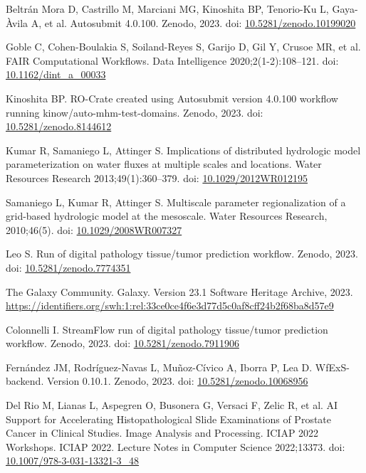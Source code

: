 \documentclass[10pt,letterpaper]{article}
\begin{document}
\begin{thebibliography}{10}
\begin{small}
Beltrán Mora D, Castrillo M, Marciani MG, Kinoshita BP, Tenorio-Ku L, Gaya-Àvila A, et al.
Autosubmit 4.0.100.
Zenodo, 2023.
doi: \href{https://doi.org/10.5281/zenodo.10199020}{10.5281/zenodo.10199020}

Goble C, Cohen-Boulakia S, Soiland-Reyes S, Garijo D, Gil Y, Crusoe MR, et al.
FAIR Computational Workflows.
Data Intelligence 2020;2(1-2):108--121.
doi: \href{https://doi.org/10.1162/dint_a_00033}{10.1162/dint\_a\_00033}

Kinoshita BP.
RO-Crate created using Autosubmit version 4.0.100 workflow running kinow/auto-mhm-test-domains.
Zenodo, 2023.
doi: \href{https://doi.org/10.5281/zenodo.8144612}{10.5281/zenodo.8144612}

Kumar R, Samaniego L, Attinger S.
Implications of distributed hydrologic model parameterization on water fluxes at multiple scales and locations.
Water Resources Research 2013;49(1):360--379.
doi: \href{https://doi.org/10.1029/2012WR012195}{10.1029/2012WR012195}

Samaniego L, Kumar R, Attinger S.
Multiscale parameter regionalization of a grid-based hydrologic model at the mesoscale.
Water Resources Research, 2010;46(5).
doi: \href{https://doi.org/10.1029/2008WR007327}{10.1029/2008WR007327}

Leo S.
Run of digital pathology tissue/tumor prediction workflow.
Zenodo, 2023.
doi: \href{https://doi.org/10.5281/zenodo.7774351}{10.5281/zenodo.7774351}

The Galaxy Community.
Galaxy. Version 23.1
Software Heritage Archive, 2023.
\url{https://identifiers.org/swh:1:rel:33ce0ce4f6e3d77d5c0af8cff24b2f68ba8d57e9}

Colonnelli I.
StreamFlow run of digital pathology tissue/tumor prediction workflow.
Zenodo, 2023.
doi: \href{https://doi.org/10.5281/zenodo.7911906}{10.5281/zenodo.7911906}

Fernández JM, Rodríguez-Navas L, Muñoz-Cívico A, Iborra P, Lea D.
WfExS-backend. Version 0.10.1.
Zenodo, 2023.
doi: \href{https://doi.org/10.5281/zenodo.10068956}{10.5281/zenodo.10068956}

Del Rio M, Lianas L, Aspegren O, Busonera G, Versaci F, Zelic R, et al.
AI Support for Accelerating Histopathological Slide Examinations of Prostate Cancer in Clinical Studies.
Image Analysis and Processing. ICIAP 2022 Workshops. ICIAP 2022. Lecture Notes in Computer Science 2022;13373.
doi: \href{https://doi.org/10.1007/978-3-031-13321-3_48}{10.1007/978-3-031-13321-3\_48}


\end{small}
\end{thebibliography}
\end{document}
